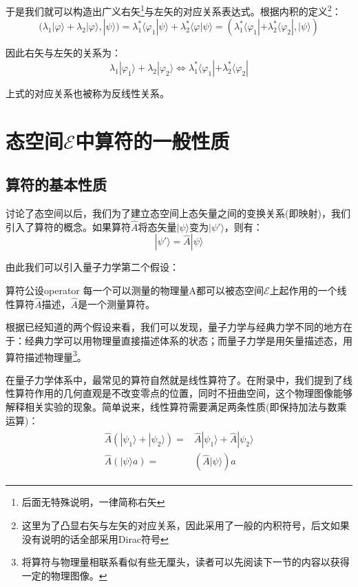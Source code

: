  于是我们就可以构造出广义右矢\footnote{后面无特殊说明，一律简称右矢}与左矢的对应关系表达式。根据内积的定义\footnote{这里为了凸显右矢与左矢的对应关系，因此采用了一般的内积符号，后文如果没有说明的话全部采用Dirac符号}：
 \begin{equation}
     (\lambda_1|\varphi\rangle+\lambda_2|\varphi\rangle,|\psi\rangle)=\lambda_1^*\langle\varphi_1|\psi\rangle+\lambda_2^*\langle\varphi|\psi\rangle=(\lambda_1^*\langle\varphi_1|+\lambda_2^*\langle\varphi_2|,|\psi\rangle)
 \end{equation}
 
 因此右矢与左矢的关系为：
 \begin{equation}
     \lambda_1|\varphi_1\rangle+\lambda_2|\varphi_2\rangle\Longleftrightarrow \lambda_1^*\langle\varphi_1|+\lambda_2^*\langle\varphi_2|
 \end{equation}
 
 上式的对应关系也被称为反线性关系。
\section{态空间$\mathscr{E}$中算符的一般性质}
    \subsection{算符的基本性质}
        讨论了态空间以后，我们为了建立态空间上态矢量之间的变换关系(即映射)，我们引入了算符的概念。如果算符$\hat{A}$将态矢量$|\psi\rangle$变为$|\psi'\rangle$，则有：
        \begin{equation}
            |\psi'\rangle =\hat{A}|\psi\rangle
        \end{equation}
        
        由此我们可以引入量子力学第二个假设：
        \begin{definition}{算符公设}{operator}
            每一个可以测量的物理量A都可以被态空间$\mathscr{E}$上起作用的一个线性算符$\hat{A}$描述，$\hat{A}$是一个测量算符。
        \end{definition}
        
        根据已经知道的两个假设来看，我们可以发现，量子力学与经典力学不同的地方在于：经典力学可以用物理量直接描述体系的状态；而量子力学是用矢量描述态，用算符描述物理量\footnote{将算符与物理量相联系看似有些无厘头，读者可以先阅读下一节的内容以获得一定的物理图像。}。
        
        在量子力学体系中，最常见的算符自然就是线性算符了。在附录中，我们提到了线性算符作用的几何直观是不改变零点的位置，同时不扭曲空间，这个物理图像能够解释相关实验的现象。简单说来，线性算符需要满足两条性质(即保持加法与数乘运算)：
        \begin{align}
            \begin{split}
                 \hat{A}(|\psi_1\rangle+|\psi_2\rangle)=&\hat{A}|\psi_1\rangle+\hat{A}|\psi_2\rangle\\
                \hat{A}(|\psi\rangle a)=&(\hat{A}|\psi\rangle)a
            \end{split}
        \end{align}
        
